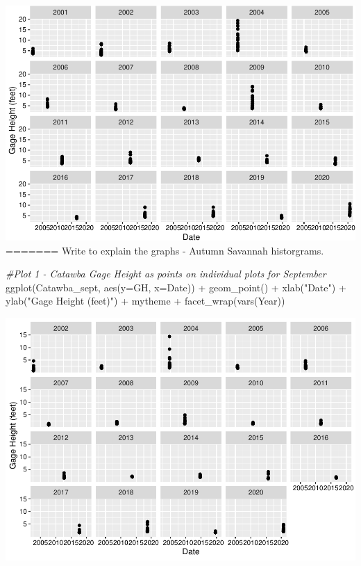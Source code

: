 \documentclass[
  12pt,
]{article}
\newenvironment{Shaded}{\begin{snugshade}}{\end{snugshade}}
\newcommand{\AttributeTok}[1]{\textcolor[rgb]{0.77,0.63,0.00}{#1}}
\newcommand{\CommentTok}[1]{\textcolor[rgb]{0.56,0.35,0.01}{\textit{#1}}}
\newcommand{\FunctionTok}[1]{\textcolor[rgb]{0.00,0.00,0.00}{#1}}
\newcommand{\NormalTok}[1]{#1}
\newcommand{\SpecialCharTok}[1]{\textcolor[rgb]{0.00,0.00,0.00}{#1}}
\newcommand{\StringTok}[1]{\textcolor[rgb]{0.31,0.60,0.02}{#1}}
\begin{document}
\includegraphics{Project_Template_files/figure-latex/Plot3-1.pdf}
=======
Write to explain the graphs - Autumn Savannah historgrams.

\begin{Shaded}
\begin{Highlighting}[]
\CommentTok{\#Plot 1 {-} Catawba Gage Height as points on individual plots for September}
\FunctionTok{ggplot}\NormalTok{(Catawba\_sept, }\FunctionTok{aes}\NormalTok{(}\AttributeTok{y=}\NormalTok{GH, }\AttributeTok{x=}\NormalTok{Date)) }\SpecialCharTok{+}
  \FunctionTok{geom\_point}\NormalTok{() }\SpecialCharTok{+}
  \FunctionTok{xlab}\NormalTok{(}\StringTok{"Date"}\NormalTok{) }\SpecialCharTok{+}
  \FunctionTok{ylab}\NormalTok{(}\StringTok{"Gage Height (feet)"}\NormalTok{) }\SpecialCharTok{+}
\NormalTok{  mytheme }\SpecialCharTok{+}
  \FunctionTok{facet\_wrap}\NormalTok{(}\FunctionTok{vars}\NormalTok{(Year)) }
\end{Highlighting}
\end{Shaded}

\includegraphics{Project_Template_files/figure-latex/Plots-1.pdf}
\end{document}
